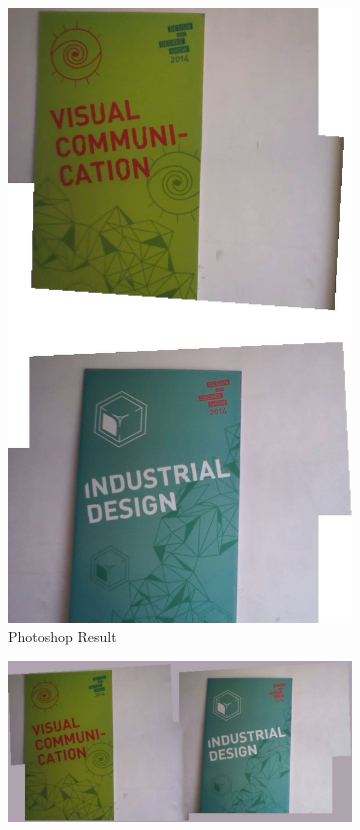 \begin{figure}
\begin{subfigure}[b]{0.45\textwidth}
\includegraphics[width=\linewidth]{figures/idc_indoor/photoshop.jpg}
\caption{Photoshop Result}
\end{subfigure}
\begin{subfigure}[b]{\textwidth}
\includegraphics[width=\linewidth]{figures/idc_indoor/our_result.jpg}

\end{subfigure}
\end{figure}
